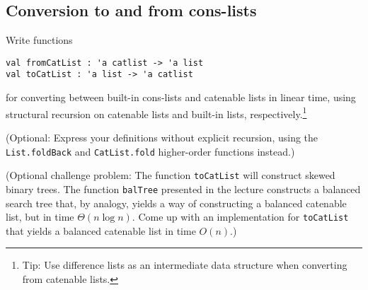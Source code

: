 \subsection*{Conversion to and from cons-lists}

Write functions
\begin{verbatim}
val fromCatList : 'a catlist -> 'a list
val toCatList : 'a list -> 'a catlist
\end{verbatim}
for converting between built-in cons-lists and catenable lists in linear time, using structural recursion on catenable lists and built-in lists, respectively.\footnote{Tip: Use difference lists as an intermediate data structure when converting from catenable lists.}

(Optional: Express your definitions without explicit recursion, using the \texttt{List.foldBack} and \texttt{CatList.fold} higher-order functions instead.)

(Optional challenge problem: The function \verb|toCatList| will construct skewed binary trees.  The function \verb|balTree| presented in the lecture constructs a balanced search tree that, by analogy, yields a way of constructing a balanced catenable list, but in time $\Theta(n \log n)$.  Come up with an implementation for \verb|toCatList| that yields a balanced catenable list in time $O(n)$.)
